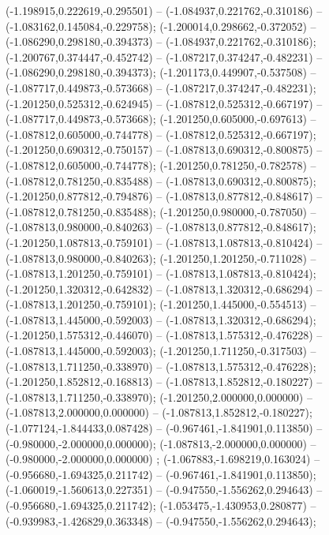  (-1.198915,0.222619,-0.295501) -- (-1.084937,0.221762,-0.310186) -- (-1.083162,0.145084,-0.229758);
 (-1.200014,0.298662,-0.372052) -- (-1.086290,0.298180,-0.394373) -- (-1.084937,0.221762,-0.310186);
 (-1.200767,0.374447,-0.452742) -- (-1.087217,0.374247,-0.482231) -- (-1.086290,0.298180,-0.394373);
 (-1.201173,0.449907,-0.537508) -- (-1.087717,0.449873,-0.573668) -- (-1.087217,0.374247,-0.482231);
 (-1.201250,0.525312,-0.624945) -- (-1.087812,0.525312,-0.667197) -- (-1.087717,0.449873,-0.573668);
 (-1.201250,0.605000,-0.697613) -- (-1.087812,0.605000,-0.744778) -- (-1.087812,0.525312,-0.667197);
 (-1.201250,0.690312,-0.750157) -- (-1.087813,0.690312,-0.800875) -- (-1.087812,0.605000,-0.744778);
 (-1.201250,0.781250,-0.782578) -- (-1.087812,0.781250,-0.835488) -- (-1.087813,0.690312,-0.800875);
 (-1.201250,0.877812,-0.794876) -- (-1.087813,0.877812,-0.848617) -- (-1.087812,0.781250,-0.835488);
 (-1.201250,0.980000,-0.787050) -- (-1.087813,0.980000,-0.840263) -- (-1.087813,0.877812,-0.848617);
 (-1.201250,1.087813,-0.759101) -- (-1.087813,1.087813,-0.810424) -- (-1.087813,0.980000,-0.840263);
 (-1.201250,1.201250,-0.711028) -- (-1.087813,1.201250,-0.759101) -- (-1.087813,1.087813,-0.810424);
 (-1.201250,1.320312,-0.642832) -- (-1.087813,1.320312,-0.686294) -- (-1.087813,1.201250,-0.759101);
 (-1.201250,1.445000,-0.554513) -- (-1.087813,1.445000,-0.592003) -- (-1.087813,1.320312,-0.686294);
 (-1.201250,1.575312,-0.446070) -- (-1.087813,1.575312,-0.476228) -- (-1.087813,1.445000,-0.592003);
 (-1.201250,1.711250,-0.317503) -- (-1.087813,1.711250,-0.338970) -- (-1.087813,1.575312,-0.476228);
 (-1.201250,1.852812,-0.168813) -- (-1.087813,1.852812,-0.180227) -- (-1.087813,1.711250,-0.338970);
 (-1.201250,2.000000,0.000000) -- (-1.087813,2.000000,0.000000) -- (-1.087813,1.852812,-0.180227);
 (-1.077124,-1.844433,0.087428) -- (-0.967461,-1.841901,0.113850) -- (-0.980000,-2.000000,0.000000);
 (-1.087813,-2.000000,0.000000) -- (-0.980000,-2.000000,0.000000) ;
 (-1.067883,-1.698219,0.163024) -- (-0.956680,-1.694325,0.211742) -- (-0.967461,-1.841901,0.113850);
 (-1.060019,-1.560613,0.227351) -- (-0.947550,-1.556262,0.294643) -- (-0.956680,-1.694325,0.211742);
 (-1.053475,-1.430953,0.280877) -- (-0.939983,-1.426829,0.363348) -- (-0.947550,-1.556262,0.294643);
